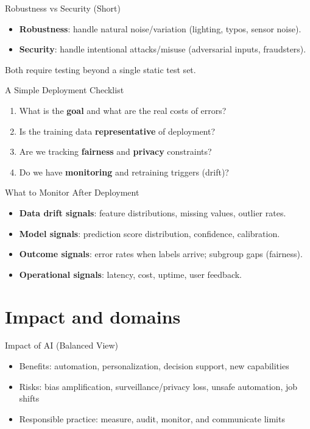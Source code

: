 \documentclass[aspectratio=169]{beamer}
\begin{document}
\begin{frame}{Robustness vs Security (Short)}
  \begin{itemize}[<+->]
    \item \textbf{Robustness}: handle natural noise/variation (lighting, typos, sensor noise).
    \item \textbf{Security}: handle intentional attacks/misuse (adversarial inputs, fraudsters).
  \end{itemize}
  Both require testing beyond a single static test set.
\end{frame}

\begin{frame}{A Simple Deployment Checklist}
  \begin{enumerate}[<+->]
    \item What is the \textbf{goal} and what are the real costs of errors?
    \item Is the training data \textbf{representative} of deployment?
    \item Are we tracking \textbf{fairness} and \textbf{privacy} constraints?
    \item Do we have \textbf{monitoring} and retraining triggers (drift)?
  \end{enumerate}
\end{frame}

\begin{frame}{What to Monitor After Deployment}
  \begin{itemize}[<+->]
    \item \textbf{Data drift signals}: feature distributions, missing values, outlier rates.
    \item \textbf{Model signals}: prediction score distribution, confidence, calibration.
    \item \textbf{Outcome signals}: error rates when labels arrive; subgroup gaps (fairness).
    \item \textbf{Operational signals}: latency, cost, uptime, user feedback.
  \end{itemize}
\end{frame}

\section{Impact and domains}
\label{sec:impact}

\begin{frame}{Impact of AI (Balanced View)}
  \begin{itemize}[<+->]
    \item Benefits: automation, personalization, decision support, new capabilities
    \item Risks: bias amplification, surveillance/privacy loss, unsafe automation, job shifts
    \item Responsible practice: measure, audit, monitor, and communicate limits
  \end{itemize}
\end{frame}
\end{document}
